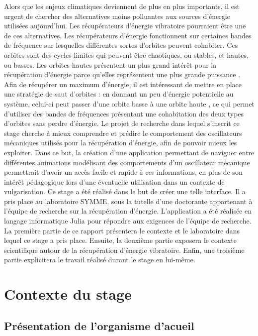 \documentclass[a4paper, french, 12pt, titlepage]{article}
\begin{document}
Alors que les enjeux climatiques deviennent de plus en plus importants, il est urgent de chercher des alternatives moins polluantes aux sources d'énergie utilisées aujourd'hui.
Les récupérateurs d'énergie vibratoire pourraient être une de ces alternatives.
Les récupérateurs d'énergie fonctionnent sur certaines bandes de fréquence sur lesquelles différentes sortes d'orbites peuvent cohabiter.
Ces orbites sont des cycles limites qui peuvent être chaotiques, ou stables, et hautes, ou basses.
Les orbites hautes présentent un plus grand intérêt pour la récupération d'énergie parce qu'elles représentent une plus grande puissance \cite{saint2022power}.
Afin de récupérer un maximum d'énergie, il est intéressant de mettre en place une stratégie de saut d'orbites : en donnant un peu d'énergie potentielle au système, celui-ci peut passer d'une orbite basse à une orbite haute \cite{huguet2018phd}, ce qui permet d'utiliser des bandes de fréquences présentant une cohabitation des deux types d'orbites sans perdre d'énergie.
Le projet de recherche dans lequel s'inscrit ce stage cherche à mieux comprendre et prédire le comportement des oscillateurs mécaniques utilisés pour la récupération d'énergie, afin de pouvoir mieux les exploiter.
Dans ce but, la création d'une application permettant de naviguer entre différentes animations modélisant des comportements d'un oscillateur mécanique permettrait d'avoir un accès facile et rapide à ces informations, en plus de son intérêt pédagogique lors d'une éventuelle utilisation dans un contexte de vulgarisation.
Ce stage a été réalisé dans le but de créer une telle interface.
Il a pris place au laboratoire SYMME, sous la tutelle d'une doctorante appartenant à l'équipe de recherche sur la récupération d'énergie.
L'application a été réalisée en langage informatique Julia pour répondre aux exigences de l'équipe de recherche.
La première partie de ce rapport présentera le contexte et le laboratoire dans lequel ce stage a pris place.
Ensuite, la deuxième partie exposera le contexte scientifique autour de la récupération d'énergie vibratoire.
Enfin, une troisième partie explicitera le travail réalisé durant le stage en lui-même.

\newpage

\section{Contexte du stage}

\subsection{Présentation de l'organisme d'acueil}
\end{document}
